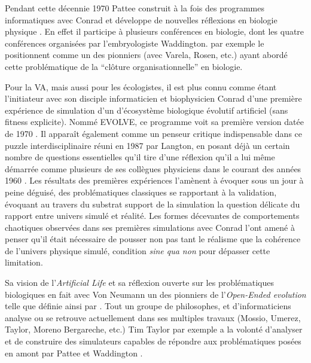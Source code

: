 Pendant cette décennie 1970 Pattee construit à la fois des programmes informatiques avec Conrad \autocites{Conrad1970,Pattee2002} et développe de nouvelles réflexions en biologie physique \autocite{Pattee2001}. En effet il participe à plusieurs conférences en biologie, dont les quatre conférences \autocite{Umerez2001} organisées par l'embryologiste Waddington.
\textcites{Mossio2009, Mossio2010} par exemple le positionnent comme un des pionniers (avec Varela, Rosen, etc.) ayant abordé cette problématique de la \enquote{clôture organisationnelle} en biologie.

Pour la VA, mais aussi pour les écologistes, il est plus connu comme étant l'initiateur avec son disciple informaticien et biophysicien Conrad d'une première expérience de simulation d'un d'écosystème biologique évolutif artificiel (sans fitness explicite). Nommé EVOLVE, ce programme voit sa première version datée de 1970 \autocites{Conrad1970, Pattee2002}. Il apparaît également comme un penseur critique indispensable dans ce puzzle interdisciplinaire réuni en 1987 par Langton, en posant déjà un certain nombre de questions essentielles qu'il tire d'une réflexion qu'il a lui même démarrée comme plusieurs de ses collègues physiciens dans le courant des années 1960 \autocites{Pattee1987, Pattee1995, Pattee2001}. Les résultats des premières expériences l'amènent à évoquer sous un jour à peine déguisé, des problématiques classiques se rapportant à la validation, évoquant au travers du substrat support de la simulation la question délicate du rapport entre univers simulé et réalité. Les formes décevantes de comportements chaotiques observées dans ses premières simulations avec Conrad l'ont amené à penser qu'il était nécessaire de pousser non pas tant le réalisme que la cohérence de l'univers physique simulé, condition \textit{sine qua non} pour dépasser cette limitation.

Sa vision de l'\textit{Artificial Life} \autocite{Pattee1995} et sa réflexion ouverte sur les problématiques biologiques en fait avec Von Neumann un des pionniers de l'\textit{Open-Ended evolution} telle que définie ainsi par \autocites{Taylor1999,Taylor2012}. Tout un groupe de philosophes, et d'informaticiens analyse ou se retrouve actuellement dans ses multiples travaux (Mossio, Umerez, Taylor, Moreno Bergareche, etc.) Tim Taylor par exemple a la volonté d'analyser et de construire des simulateurs capables de répondre aux problématiques posées en amont par Pattee et Waddington \autocite{Taylor1999}.

